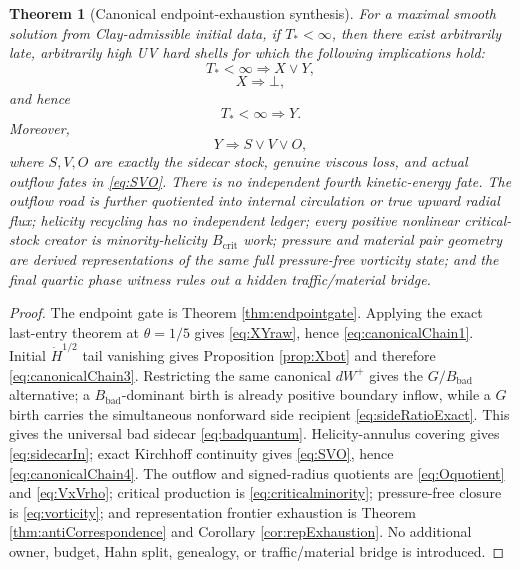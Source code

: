 \documentclass[11pt]{article}
\newtheorem{theorem}{Theorem}[section]
\newcommand{\Hdot}{\dot H}
\begin{document}
\begin{theorem}[Canonical endpoint-exhaustion synthesis]\label{thm:canonicalSynthesis}
For a maximal smooth solution from Clay-admissible initial data, if $T_*<\infty$, then there exist arbitrarily late, arbitrarily high UV hard shells for which the following implications hold:
\begin{equation}\label{eq:canonicalChain1}
T_*<\infty
\Longrightarrow
X\vee Y,
\end{equation}
\begin{equation}\label{eq:canonicalChain2}
X\Longrightarrow\bot,
\end{equation}
and hence
\begin{equation}\label{eq:canonicalChain3}
T_*<\infty\Longrightarrow Y.
\end{equation}
Moreover,
\begin{equation}\label{eq:canonicalChain4}
Y\Longrightarrow S\vee V\vee O,
\end{equation}
where $S,V,O$ are exactly the sidecar stock, genuine viscous loss, and actual outflow fates in \eqref{eq:SVO}.  There is no independent fourth kinetic-energy fate.  The outflow road is further quotiented into internal circulation or true upward radial flux; helicity recycling has no independent ledger; every positive nonlinear critical-stock creator is minority-helicity $B_{\mathrm{crit}}$ work; pressure and material pair geometry are derived representations of the same full pressure-free vorticity state; and the final quartic phase witness rules out a hidden traffic/material bridge.
\end{theorem}

\begin{proof}
The endpoint gate is Theorem \ref{thm:endpointgate}.  Applying the exact last-entry theorem at $\theta=1/5$ gives \eqref{eq:XYraw}, hence \eqref{eq:canonicalChain1}.  Initial $\Hdot^{1/2}$ tail vanishing gives Proposition \ref{prop:Xbot} and therefore \eqref{eq:canonicalChain3}.  Restricting the same canonical $dW^+$ gives the $G/B_{\mathrm{bad}}$ alternative; a $B_{\mathrm{bad}}$-dominant birth is already positive boundary inflow, while a $G$ birth carries the simultaneous nonforward side recipient \eqref{eq:sideRatioExact}.  This gives the universal bad sidecar \eqref{eq:badquantum}.  Helicity-annulus covering gives \eqref{eq:sidecarIn}; exact Kirchhoff continuity gives \eqref{eq:SVO}, hence \eqref{eq:canonicalChain4}.  The outflow and signed-radius quotients are \eqref{eq:Oquotient} and \eqref{eq:VxVrho}; critical production is \eqref{eq:criticalminority}; pressure-free closure is \eqref{eq:vorticity}; and representation frontier exhaustion is Theorem \ref{thm:antiCorrespondence} and Corollary \ref{cor:repExhaustion}.  No additional owner, budget, Hahn split, genealogy, or traffic/material bridge is introduced.
\end{proof}
\end{document}
